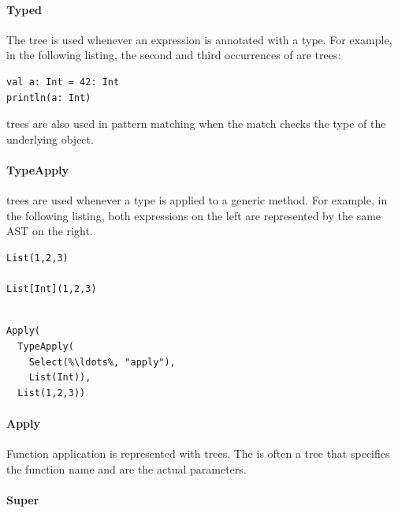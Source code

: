 \paragraph{Typed} 

\noindent The  tree is used whenever an expression is annotated with a type. For example, in the following listing, the second and third occurrences of  are  trees:

\begin{lstlisting}
val a: Int = 42: Int
println(a: Int)
\end{lstlisting}

 trees are also used in pattern matching when the match checks the type of the underlying object.

\paragraph{TypeApply} 

\noindent {} trees are used whenever a type is applied to a generic method. For example, in the following listing, both expressions on the left are represented by the same AST on the right.

\begin{multicols}{2}
\begin{lstlisting}
List(1,2,3)

List[Int](1,2,3)


\end{lstlisting}
\begin{lstlisting}
Apply(
  TypeApply(
    Select(%\ldots%, "apply"), 
    List(Int)), 
  List(1,2,3))
\end{lstlisting}
\end{multicols}

\paragraph{Apply} 

\noindent Function application is represented with  trees. The  is often a  tree that specifies the function name and  are the actual parameters.

\paragraph{Super} 

